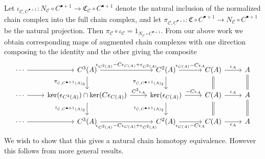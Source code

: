 Let $\iota_{\mathcal{C},C^{\bullet+1}}:N_\mathcal{C}\circ C^{\bullet+1}\to \mathfrak{C}_\mathcal{C}\circ C^{\bullet+1}$ denote the natural inclusion of the normalized chain complex into the full chain complex, and let $\pi_{\mathcal{C},C^{\bullet+1}}:\mathfrak{C}\circ C^{\bullet+1}\to N_\mathcal{C}\circ C^{\bullet+1}$ be the natural projection. Then $\pi_\mathcal{C}\circ \iota_\mathcal{C} = 1_{N_\mathcal{C}\circ C^{\bullet+1}}$. From our above work we obtain corresponding maps of augmented chain complexes with one direction composing to the identity and the other giving the composite
\[\begin{tikzcd}
	\cdots & {C^3(A)} & {C^2(A)} & {C(A)} & A \\
	\cdots & {\ker(\epsilon_{C^2(A)})\cap \ker(C\epsilon_{C(A)})} & {\ker(\epsilon_{C(A)})} & {C(A)} & A \\
	\cdots & {C^3(A)} & {C^2(A)} & {C(A)} & A
	\arrow["{-C\epsilon_A}", from=2-3, to=2-4]
	\arrow["{\epsilon_A}", from=2-4, to=2-5]
	\arrow["{C^2\epsilon_A}", from=2-2, to=2-3]
	\arrow[from=2-1, to=2-2]
	\arrow[Rightarrow, no head, from=2-5, to=3-5]
	\arrow["{\epsilon_A}"', from=3-4, to=3-5]
	\arrow[Rightarrow, no head, from=2-4, to=3-4]
	\arrow["{\epsilon_{C(A)}-C\epsilon_A}"', from=3-3, to=3-4]
	\arrow["{\iota_{\mathcal{C},C^{\bullet+1}(A)_2}}"', from=2-3, to=3-3]
	\arrow["{\iota_{\mathcal{C},C^{\bullet+1}(A)_3}}"', from=2-2, to=3-2]
	\arrow["{\epsilon_{C^2(A)}-C\epsilon_{C(A)}+\epsilon_{C^2(A)}}"', from=3-2, to=3-3]
	\arrow[from=3-1, to=3-2]
	\arrow[from=1-1, to=1-2]
	\arrow[Rightarrow, no head, from=1-5, to=2-5]
	\arrow[Rightarrow, no head, from=1-4, to=2-4]
	\arrow["{\epsilon_A}", from=1-4, to=1-5]
	\arrow["{\epsilon_{C(A)}-C\epsilon_A}", from=1-3, to=1-4]
	\arrow["{\pi_{\mathcal{C},C^{\bullet+1}(A)_2}}"', from=1-3, to=2-3]
	\arrow["{\pi_{\mathcal{C},C^{\bullet+1}(A)_3}}"', from=1-2, to=2-2]
	\arrow["{\epsilon_{C^2(A)}-C\epsilon_{C(A)}+\epsilon_{C^2(A)}}", from=1-2, to=1-3]
\end{tikzcd}\]
We wish to show that this gives a natural chain homotopy equivalence. However this follows from more general results.


